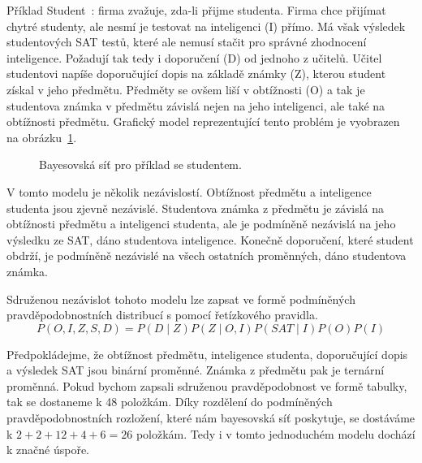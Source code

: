Příklad Student~\cite{koller2009probabilistic}: firma zvažuje, zda-li přijme studenta.
Firma chce přijímat chytré studenty, ale nesmí je testovat na inteligenci (I) přímo.
Má však výsledek studentových SAT testů, které ale nemusí stačit pro správné zhodnocení inteligence.
Požadují tak tedy i doporučení (D) od jednoho z učitelů.
Učitel studentovi napíše doporučující dopis na základě známky (Z), kterou student získal v jeho předmětu.
Předměty se ovšem liší v obtížnosti (O) a tak je studentova známka v předmětu závislá nejen na jeho inteligenci, ale také na obtížnosti předmětu.
Grafický model reprezentující tento problém je vyobrazen na obrázku~\ref{fig:student}.
\begin{figure}
\begin{center}
\end{center}
\label{fig:student}
\caption{Bayesovská síť pro příklad se studentem.}
\end{figure}

V tomto modelu je několik nezávislostí. Obtížnost předmětu a inteligence studenta jsou zjevně nezávislé.
Studentova známka z předmětu je závislá na obtížnosti předmětu a inteligenci studenta, ale je podmíněně nezávislá na jeho výsledku ze SAT, dáno studentova inteligence.
Konečně doporučení, které student obdrží, je podmíněně nezávislé na všech ostatních proměnných, dáno studentova známka.

Sdruženou nezávislot tohoto modelu lze zapsat ve formě podmíněných pravděpodobnostních distribucí s pomocí řetízkového pravidla.
\begin{equation}
P(O, I, Z, S, D) = P(D \mid Z) P(Z \mid O, I) P(SAT \mid I) P(O) P(I)
\end{equation}

Předpokládejme, že obtížnost předmětu, inteligence studenta, doporučující dopis a výsledek SAT jsou binární proměnné.
Známka z předmětu pak je ternární proměnná.
Pokud bychom zapsali sdruženou pravděpodobnost ve formě tabulky, tak se dostaneme k 48 položkám.
Díky rozdělení do podmíněných pravděpodobnostních rozložení, které nám bayesovská síť poskytuje, se dostáváme k $2 + 2 + 12 + 4 + 6 = 26$ položkám.
Tedy i v tomto jednoduchém modelu dochází k značné úspoře.

